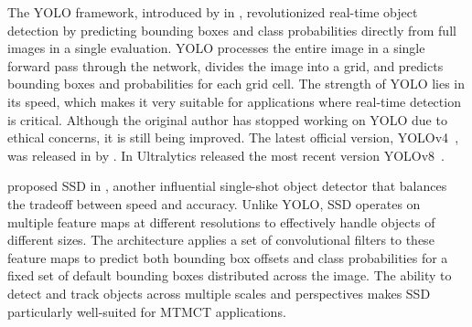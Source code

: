 The YOLO framework, introduced by \citeauthor{Redmon15} in \citeyear{Redmon15}, revolutionized real-time object detection by predicting bounding boxes and class probabilities directly from full images in a single evaluation. YOLO processes the entire image in a single forward pass through the network, divides the image into a grid, and predicts bounding boxes and probabilities for each grid cell. The strength of YOLO lies in its speed, which makes it very suitable for applications where real-time detection is critical. Although the original author has stopped working on YOLO due to ethical concerns, it is still being improved. The latest official version, YOLOv4~\cite{Bochkovskiy20}, was released in \citeyear{Bochkovskiy20} by \citeauthor{Bochkovskiy20}. In \citeyear{Jocher23a} Ultralytics released the most recent version YOLOv8~\cite{Jocher23a, Jocher23b}.

\citeauthor{Liu16} proposed SSD in \citeyear{Liu16}, another influential single-shot object detector that balances the tradeoff between speed and accuracy. Unlike YOLO, SSD operates on multiple feature maps at different resolutions to effectively handle objects of different sizes. The architecture applies a set of convolutional filters to these feature maps to predict both bounding box offsets and class probabilities for a fixed set of default bounding boxes distributed across the image. The ability to detect and track objects across multiple scales and perspectives makes SSD particularly well-suited for MTMCT applications.

\begin{table}[ht]
    \centering
    \caption{Overview Object Detectors}\label{tab:overview_object_detectors}
\end{table}

